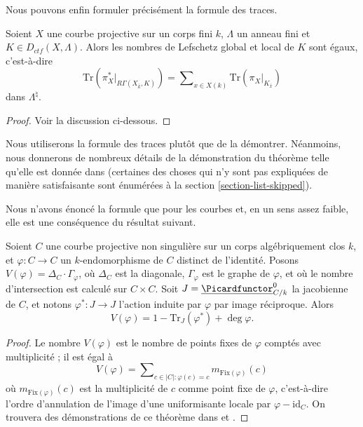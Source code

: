 \noindent
Nous pouvons enfin formuler précisément la formule des traces.

\begin{theorem}
\label{theorem-trace}
Soient $X$ une courbe projective sur un corps fini $k$, $\Lambda$ un anneau fini
et $K \in D_{ctf}(X, \Lambda)$. Alors les nombres de Lefschetz global et local
de $K$ sont égaux, c'est-à-dire
\begin{equation}
\label{equation-trace-formula}
\text{Tr}(\pi^*_X |_{R\Gamma(X_{\bar k}, K)})
=
\sum\nolimits_{x\in X(k)} \text{Tr}(\pi_X |_{K_{\bar x}})
\end{equation}
dans $\Lambda^\natural$.
\end{theorem}

\begin{proof}
Voir la discussion ci-dessous.
\end{proof}

\noindent
Nous utiliserons la formule des traces plutôt que de la démontrer. Néanmoins, nous
donnerons de nombreux détails de la démonstration du théorème telle qu'elle est donnée dans
\cite{SGA4.5} (certaines des choses qui n'y sont pas expliquées de manière satisfaisante
sont énumérées à la section \ref{section-list-skipped}).

\medskip\noindent
Nous n'avons énoncé la formule que pour les courbes et, en un sens assez
faible, elle est une conséquence du résultat suivant.

\begin{theorem}[Weil]
\label{theorem-weil-trace-formula}
Soient $C$ une courbe projective non singulière sur un corps algébriquement clos
$k$, et $\varphi : C \to C$ un $k$-endomorphisme de $C$ distinct de
l'identité. Posons $V(\varphi) = \Delta_C \cdot \Gamma_\varphi$, où $\Delta_C$ est
la diagonale, $\Gamma_\varphi$ est le graphe de $\varphi$, et où le nombre d'intersection
est calculé sur $C \times C$. Soit $J = \underline{\Picardfunctor}^0_{C/k}$
la jacobienne de $C$, et notons $\varphi^* : J \to J$ l'action induite par
$\varphi$ par image réciproque. Alors
$$
V(\varphi) = 1 - \text{Tr}_J(\varphi^*) + \deg \varphi.
$$
\end{theorem}

\begin{proof}
Le nombre $V(\varphi)$ est le nombre de points fixes de $\varphi$ comptés avec multiplicité ; il est égal
à
$$
V(\varphi) =
\sum\nolimits_{c \in |C| : \varphi(c) = c} m_{\text{Fix}(\varphi)} (c)
$$
où $m_{\text{Fix}(\varphi)} (c)$ est la multiplicité de $c$ comme point fixe
de $\varphi$, c'est-à-dire l'ordre d'annulation de l'image d'une uniformisante locale
par $\varphi - \text{id}_C$. On trouvera des démonstrations de ce théorème dans
\cite{Lang} et \cite{Weil}.
\end{proof}


